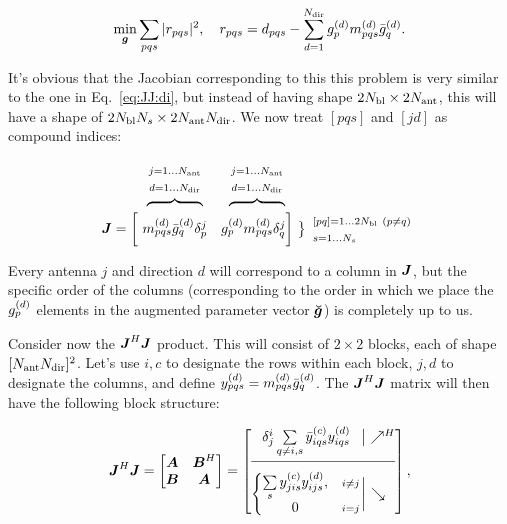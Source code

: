 \documentclass[useAMS,usenatbib]{mn2e}
\makeatletter
\newcommand{\mat}[1]{{\bmath{#1}}}
\newcommand{\JJ}{\mat{J}} %
\newcommand{\JHJ}{\JJ^H\JJ} %
\newcommand{\Matrix}[2]{\left [ \begin{array}{@{}#1@{}}#2\end{array} \right ]}
\newcommand{\Stack}[1]{\begin{array}{@{}c@{}}#1\end{array}}
\newcommand{\AUG}[1]{\bmath{\breve{#1}}}
\newcommand{\Gg}{\AUG{g}}
\makeatother
\begin{document}
\begin{equation}
\label{eq:cal:dd:unpol}
\min_{\bmath{g}}\sum_{pqs}|r_{pqs}|^2, ~~~
r_{pqs} = d_{pqs} - \sum_{d=1}^{\Nd} \ggd_p \mmd_{pqs} \ggdH_q.
\end{equation}

It's obvious that the Jacobian corresponding to this  this problem is very similar to the one 
in Eq.~\ref{eq:JJ:di}, but instead of having shape $2N_\mathrm{bl}\times2N_\mathrm{ant}$, this will have a 
shape of $2N_\mathrm{bl}N_s\times 2N_\mathrm{ant}N_\mathrm{dir}$. We now treat $[pqs]$ and $[jd]$ as compound indices: 

\[
\begin{array}{r@{~}cc@{~}cc}
 & \overbrace{~~~~~~~~~~~~}^{\Stack{\scriptstyle j=1\dots \Na\\\scriptstyle d=1\dots \Nd}} & 
   \overbrace{~~~~~~~~~~~~}^{\Stack{\scriptstyle j=1\dots \Na\\\scriptstyle d=1\dots \Nd}} \\
\JJ = \bigg [ &
  \mmd_{pqs}\ggdH_q \delta^j_p & 
  \ggd_p \mmd_{pqs}  \delta^j_q 
\bigg ] &
\big \}
\begin{array}{l}
\scriptstyle [pq]=1\dots 2\Nbl~(p\ne q)\\ \scriptstyle s=1\dots\Ns
\end{array}

\end{array}
\]

Every antenna $j$ and direction $d$ will correspond to a column in $\JJ$, but the specific order of the columns 
(corresponding to the order in which we place the $g^{(d)}_p$ elements in the augmented parameter vector $\Gg$)
is completely up to us. 

Consider now the $\JHJ$ product. This will consist of $2\times2$ blocks, each of shape 
$[N_\mathrm{ant}N_\mathrm{dir}]^2$. Let's use $i,c$ to designate the rows within each block, $j,d$ to designate the columns, 
and define $y^{(d)}_{pqs}=m^{(d)}_{pqs}\bar{g}^{(d)}_q$. The $\JHJ$ matrix will then have the following block 
structure:

\begin{equation}
\JHJ = \Matrix{cc}{\bmath{A}&\bmath{B}^H\\\bmath{B}&\bmath{A}}
= \JHJblocks{
  \delta^i_j \sum\limits_{q\ne i,s} \yycH_{iqs} \yyd_{iqs} 
}{
  \left \{ 
  \begin{array}{@{}cc@{}}
   \sum\limits_{s} \yyc_{jis} \yyd_{ijs},&{\scriptstyle i\ne j} \\
   0 &{\scriptstyle i=j}
  \end{array} \right . 
},
\label{eq:JHJ:DD:unpol}
\end{equation}
\end{document}
